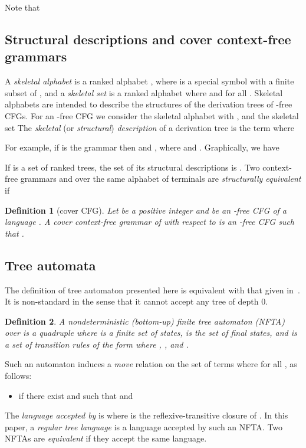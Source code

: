 \documentclass[preprint,12pt,english]{article}
\newtheorem{definition}{Definition}
\begin{document}
 Note that 
\subsection*{Structural descriptions and cover context-free grammars}
A {\em skeletal alphabet} is a ranked alphabet  , where  is a special symbol with  a finite subset of , and a {\em skeletal set} is a ranked alphabet  where  and  for all . 
Skeletal alphabets are intended to describe the structures of the derivation trees of -free CFGs. For an -free CFG  we consider the skeletal alphabet  with , and the skeletal set 
The {\em skeletal} (or {\em structural}) {\em description} of a derivation tree  is the term  where 
 
For example, if  is the grammar  then  and , where  and . Graphically,  we have
\begin{center}
\quad\qquad
{}
\end{center}
If  is a set of ranked trees, the set of its structural descriptions is  . Two context-free grammars  and  over the same alphabet of terminals are {\em structurally equivalent} if 

\begin{definition}[cover CFG]
Let  be a positive integer and  be an -free CFG of a language . 
A {\em cover context-free grammar} of  with respect to  is an -free CFG  such that . 
\end{definition}

\subsection*{Tree automata}

The definition of tree automaton presented here is equivalent with that given in~\cite{Sak:1990}. It is non-standard in the sense that it cannot accept any tree of depth 0. 
\begin{definition}
A {\em  nondeterministic (bottom-up) finite tree automaton} (NFTA) over  is a quadruple  where  is a finite set of {\em states},  is the set of {\em final states}, and  is a set of {\em transition rules} of the form  where , ,  and . 
\end{definition}
Such an automaton  induces a {\em move} relation  on the set of terms  where  for all , as follows: 
\begin{itemize}
\item[]  if there exist  and  such that  and 
\end{itemize}
The {\em language accepted by } is  where  is the reflexive-transitive closure of . In this paper, a {\em regular tree language} is a language accepted by such an NFTA.
Two NFTAs are {\em equivalent} if they accept the same language.
\end{document}
